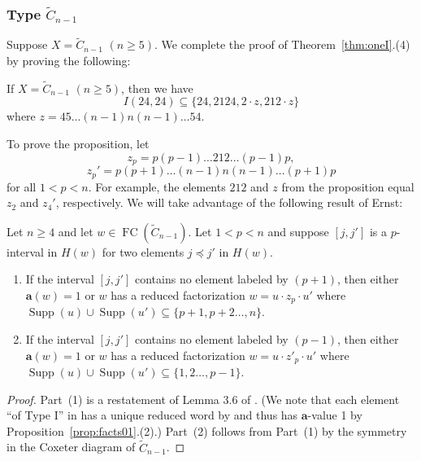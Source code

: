 \documentclass[ALCO,Unicode,published]{cedram}
\newcommand{\la}{\mathbf{a}}
\newcommand{\se}{\subseteq}
\DeclareMathOperator{\supp}{\mathrm{Supp}}
\DeclareMathOperator{\fc}{\mathrm{FC}}
\begin{document}
\subsubsection{Type $\tilde C_{n-1}$}
Suppose $X=\tilde C_{n-1}$ $(n\ge 5)$. We complete the proof of Theorem~\ref{thm:oneI}.(4) by proving the
following:
\begin{prop}    \label{prop:affineC} If $X=\tilde C_{n-1}$ $(n\ge 5)$, then we have \[ I(24,24)\se
      \{24,2124,2\cdot z,212\cdot z\}\] where $z=45\dots (n-1)n(n-1)\dots 54$.
\end{prop} To prove the proposition, let \[ z_p=p(p-1)\dots 212\dots (p-1)p, \] \[ z_p'=p(p+1)\dots
    (n-1)n(n-1)\dots (p+1)p \] for all $1<p<n$. For example, the elements $212$ and $z$ from the
    proposition equal $z_2$ and $z_4'$, respectively.  We will take advantage of the following
    result of Ernst:

\begin{lemma}
    \label{lemm:Dana}
    Let $n\ge 4$ and let $w\in \fc(\tilde C_{n-1})$. Let $1<p<n$ and suppose $[j,j']$ is a $p$-interval in $H(w)$
    for two elements $j\preceq j'$ in $H(w)$.
\begin{enumerate}
    \item If the interval $[j,j']$ contains no element labeled by $(p+1)$, then
    either $\la(w)=1$ or $w$ has a reduced factorization $w=u\cdot z_p\cdot u'$
  where $\supp(u)\cup\supp(u')\se\{p+1,p+2\dots, n\}$.  \item If the interval
    $[j,j']$ contains no element labeled by $(p-1)$, then either $\la(w)=1$ or
    $w$ has a reduced factorization $w=u\cdot z'_p\cdot u'$ where
    $\supp(u)\cup\supp(u')\se\{1,2\dots, p-1\}$.
\end{enumerate} \end{lemma} 
\begin{proof} Part~(1) is a restatement of Lemma 3.6 of \cite{ErnstTL}. (We note that each element ``of
    Type I'' in \cite{ErnstTL} has a unique reduced word by \cite[\S3.1]{ErnstTL} and thus has $\la$-value 1 by
Proposition~\ref{prop:facts01}.(2).) Part~(2) follows from Part~(1) by the symmetry in the Coxeter diagram of
      $\tilde C_{n-1}$.
\end{proof}
\end{document}
